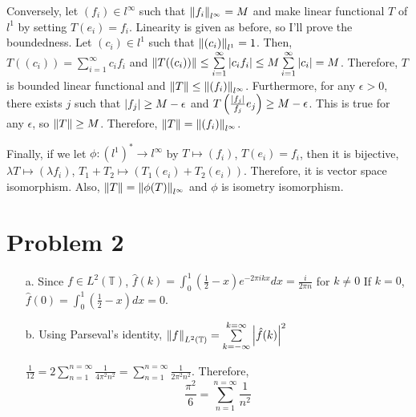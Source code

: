 \documentclass{article}
\begin{document}
Conversely, let $(f_i)\in l^\infty$ such that $\norm{f_i}_{l^\infty}=M$ and make linear functional $T$ of $l^1$ by setting $T(e_i)=f_i$. Linearity is given as before, so I'll prove the boundedness. Let $(c_i)\in l^1$ such that $\norm{(c_i)}_{l^1}=1$. Then, $T((c_i))=\sum\limits_{i=1}^\infty c_i f_i$ and $\norm{T((c_i))}\leq \sum\limits_{i=1}^\infty \abs{c_i f_i}\leq M \sum\limits_{i=1}^\infty \abs{c_i}=M$. Therefore, $T$ is bounded linear functional and $\norm{T}\leq \norm{(f_i)}_{l^\infty}$. Furthermore, for any $\epsilon>0$, there exists $j$ such that $\abs{f_j}\geq M-\epsilon$ and $T\left(\frac{\abs{f_j}}{f_j}e_j\right)\geq M-\epsilon$. This is true for any $\epsilon$, so $\norm{T}\geq M$. Therefore, $\norm{T}=\norm{(f_i)}_{l^\infty}$.

Finally, if we let $\phi:(l^1)^*\rightarrow l^\infty$ by $T\mapsto (f_i)$, $T(e_i)=f_i$, then it is bijective, $\lambda T\mapsto (\lambda f_i)$, $T_1+T_2\mapsto (T_1(e_i)+T_2(e_i))$. Therefore, it is vector space isomorphism. Also, $\norm{T}=\norm{\phi(T)}_{l^\infty}$ and $\phi$ is isometry isomorphism.

\section*{Problem 2}
\begin{enumerate}
\item[a.] Since $f\in L^2(\mathbb{T})$, $\hat{f}(k)=\int_0^1 \left(\frac{1}{2}-x\right) e^{-2\pi ik x} dx=\frac{i}{2\pi n}$ for $k\neq 0$ If $k=0$, $\hat{f}(0)=\int_0^1 \left(\frac{1}{2}-x\right) dx = 0$.
\item[b.] Using Parseval's identity, $\norm{f}_{L^2(\mathbb{T})}=\sum\limits_{k=-\infty}^{k=\infty} \abs{\hat{f}(k)}^2$

$\frac{1}{12}=2\sum\limits_{n=1}^{n=\infty} \frac{1}{4\pi^2 n^2} = \sum\limits_{n=1}^{n=\infty} \frac{1}{2\pi^2 n^2}$. Therefore,
\begin{equation*}
\frac{\pi^2}{6}=\sum\limits_{n=1}^{n=\infty} \frac{1}{n^2}
\end{equation*}
\end{enumerate}
\end{document}
